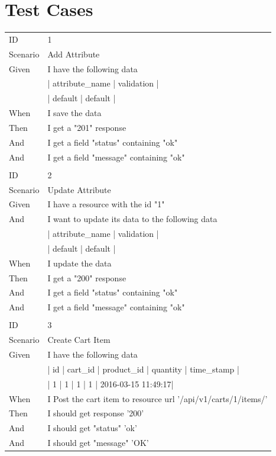 \documentclass{report}
\begin{document}
\chapter{Test Cases}
\label{chap:Test Cases}
\begin{tabular}{ l l }
ID 			& 1 \\
Scenario		& Add Attribute\\
Given 		& I have the following data \\
			& | attribute\_name | validation | \\
      		& | default | default | \\
When 		& I save the data \\
Then 		& I get a "201" response \\
And			& I get a field "status" containing "ok" \\
And 			& I get a field "message" containing "ok" \\ \\
ID 			& 2 \\
Scenario		& Update Attribute \\
Given 		& I have a resource with the id "1" \\
And 			& I want to update its data to the following data \\
      		& | attribute\_name | validation | \\
      		& | default | default | \\
When 		& I update the data \\
Then 		& I get a "200" response \\
And 			& I get a field "status" containing "ok" \\
And 			& I get a field "message" containing "ok" \\ \\
ID 			& 3 \\
Scenario		& Create Cart Item \\
Given 		& I have the following data \\
     		& | id | cart\_id | product\_id | quantity   | time\_stamp |\\
     		& | 1  | 1       | 1          | 1          | 2016-03-15 11:49:17|\\
When 		& I Post the cart item to resource url  '/api/v1/carts/1/items/' \\
Then 		& I should get response '200' \\
And 			& I should get "status" 'ok'\\
And 			& I should get "message" 'OK'

\end{tabular}
\newpage
\end{document}
